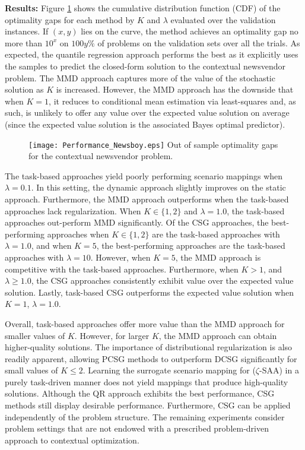 \vspace{\littlespace}
\noindent \textbf{Results: } Figure \ref{fig:newsvendor} shows the cumulative distribution function (CDF) of the optimality gaps for each method by $K$ and $\lambda$ evaluated over the validation instances. If $(x,y)$ lies on the curve, the method achieves an optimality gap no more than $10^{x}$ on $100y\%$ of problems on the validation sets over all the trials. As expected, the quantile regression approach performs the best as it explicitly uses the samples to predict the closed-form solution to the contextual newsvendor problem. The MMD approach captures more of the value of the stochastic solution as $K$ is increased. However, the MMD approach has the downside that when $K = 1$, it reduces to conditional mean estimation via least-squares and, as such, is unlikely to offer any value over the expected value solution on average (since the expected value solution is the associated Bayes optimal predictor). 


\begin{figure}
    \FIGURE
    {\texttt{[image: Performance\_Newsboy.eps]}}
    {Out of sample optimality gaps for the contextual newsvendor problem.\label{fig:newsvendor}}
    {}
\end{figure}

The task-based approaches yield poorly performing scenario mappings when \hbox{$\lambda = 0.1$}. In this setting, the dynamic approach slightly improves on the static approach. Furthermore, the MMD approach outperforms when the task-based approaches lack regularization. When $K \in \{1, 2\}$ and $\lambda = 1.0$, the task-based approaches out-perform MMD significantly. Of the CSG approaches, the best-performing approaches when $K \in \{1, 2\}$ are the task-based approaches with $\lambda = 1.0$, and when $K = 5$, the best-performing approaches are the task-based approaches with $\lambda = 10$. However, when $K = 5$, the MMD approach is competitive with the task-based approaches. Furthermore, when $K > 1$, and $\lambda \geq 1.0$, the CSG approaches consistently exhibit value over the expected value solution. Lastly, task-based CSG outperforms the expected value solution when $K = 1$, $\lambda = 1.0$.


Overall, task-based approaches offer more value than the MMD approach for smaller values of $ K $. However, for larger $K$, the MMD approach can obtain higher-quality solutions. The importance of distributional regularization is also readily apparent, allowing PCSG methods to outperform DCSG significantly for small values of $K \leq 2$. Learning the surrogate scenario mapping for ($\zeta$-SAA) in a purely task-driven manner does not yield mappings that produce high-quality solutions. Although the QR approach exhibits the best performance, CSG methods still display desirable performance. Furthermore, CSG can be applied independently of the problem structure. The remaining experiments consider problem settings that are not endowed with a prescribed problem-driven approach to contextual optimization. 




